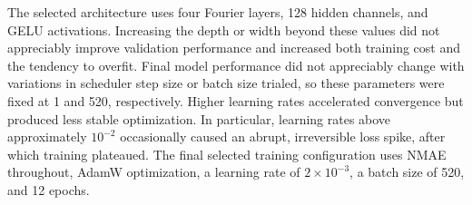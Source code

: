 \documentclass[preprint,review,12pt,numafflabel]{elsarticle}
\begin{document}
The selected architecture uses four Fourier layers, 128 hidden channels, and GELU activations. Increasing the depth or width beyond these values did not appreciably improve validation performance and increased both training cost and the tendency to overfit. Final model performance did not appreciably change with variations in scheduler step size or batch size trialed, so these parameters were fixed at 1 and 520, respectively. Higher learning rates accelerated convergence but produced less stable optimization. In particular, learning rates above approximately $10^{-2}$ occasionally caused an abrupt, irreversible loss spike, after which training plateaued. The final selected training configuration uses NMAE throughout, AdamW optimization, a learning rate of $2\times10^{-3}$, a batch size of 520, and 12 epochs. 

\end{document}
